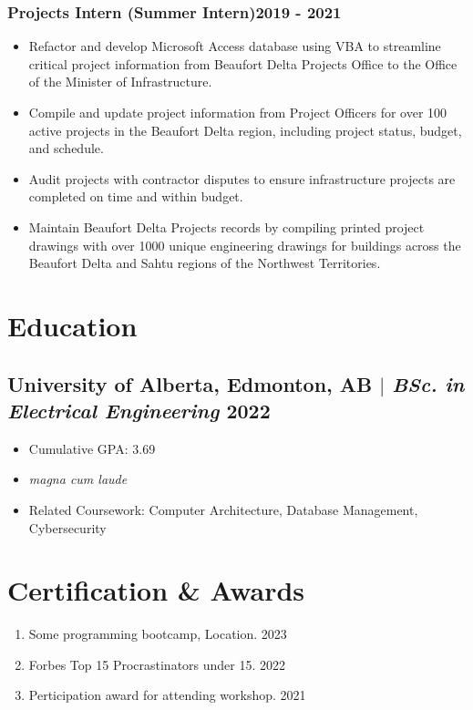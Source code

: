 \documentclass[11pt]{article} %
\begin{document}
\subsubsection{Projects Intern (Summer Intern)\hfill 2019 - 2021}
\begin{itemize}
	\item Refactor and develop Microsoft Access database using VBA to streamline critical project information from Beaufort Delta Projects Office to the Office of the Minister of Infrastructure. 
	\item Compile and update project information from Project Officers for over 100 active projects in the Beaufort Delta region, including project status, budget, and schedule. 
	\item Audit projects with contractor disputes to ensure infrastructure projects are completed on time and within budget.
	\item Maintain Beaufort Delta Projects records by compiling printed project drawings with over 1000 unique engineering drawings for buildings across the Beaufort Delta and Sahtu regions of the Northwest Territories. 
\end{itemize}


\section{Education}
\subsection{University of Alberta, Edmonton, AB $|$ {\normalfont\itshape BSc. in Electrical Engineering} \hfill 2022}
\begin{itemize}
	\item Cumulative GPA: 3.69
	\item \textit{magna cum laude} 
  \item Related Coursework: Computer Architecture, Database Management, Cybersecurity
\end{itemize}


\section{Certification \& Awards}
\begin{enumerate}[label=\null, left=0pt..0pt, itemsep=0pt]
	\item Some programming bootcamp, Location. \hfill 2023
	\item Forbes Top 15 Procrastinators under 15. \hfill 2022
	\item Perticipation award for attending workshop. \hfill 2021
\end{enumerate}
\end{document}
